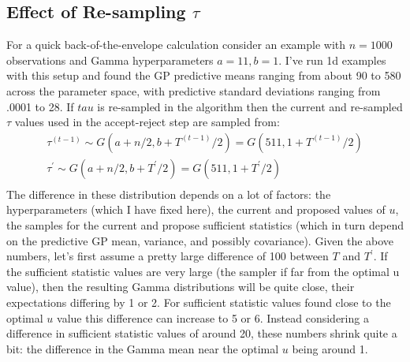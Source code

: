 \documentclass[12pt]{article}
\begin{document}
\subsection{Effect of Re-sampling $\tau$}
For a quick back-of-the-envelope calculation consider an example with $n = 1000$ observations and Gamma hyperparameters $a = 11, b = 1$. I've run 1d examples with this 
setup and found the GP predictive means ranging from about 90 to 580 across the parameter space, with predictive standard deviations ranging from .0001 to 28. If $tau$ is 
re-sampled in the algorithm then the current and re-sampled $\tau$ values used in the accept-reject step are sampled from: 
\begin{align*}
\tau^{(t - 1)} \sim G(a + n/2, b + T^{(t-1)}/2) = G(511, 1 + T^{(t-1)}/2) \\
\tau^\prime \sim G(a + n/2, b + T^\prime/2) = G(511, 1 + T^\prime/2) \\
\end{align*}
The difference in these distribution depends on a lot of factors: the hyperparameters (which I have fixed here), the current and proposed values of $u$, the samples for the 
current and propose sufficient statistics (which in turn depend on the predictive GP mean, variance, and possibly covariance). Given the above numbers, let's first assume a pretty 
large difference of 100 between $T$ and $T^\prime$. If the sufficient statistic values are very large (the sampler if far from the optimal u value), then the resulting Gamma distributions
will be quite close, their expectations differing by 1 or 2. For sufficient statistic values found close to the optimal $u$ value this difference can increase to 5 or 6. Instead considering 
a difference in sufficient statistic values of around 20, these numbers shrink quite a bit: the difference in the Gamma mean near the optimal $u$ being around 1. 
\end{document}
